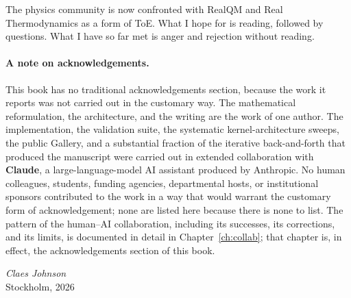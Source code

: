 The physics community is now confronted with RealQM and Real Thermodynamics as a
form of ToE. What I hope for is reading, followed by questions. What I have so
far met is anger and rejection without reading.

\paragraph{A note on acknowledgements.}
This book has no traditional acknowledgements section, because the work it reports was not carried out in the customary way. The mathematical reformulation, the architecture, and the writing are the work of one author. The implementation, the validation suite, the systematic kernel-architecture sweeps, the public Gallery, and a substantial fraction of the iterative back-and-forth that produced the manuscript were carried out in extended collaboration with \textbf{Claude}, a large-language-model AI assistant produced by Anthropic. No human colleagues, students, funding agencies, departmental hosts, or institutional sponsors contributed to the work in a way that would warrant the customary form of acknowledgement; none are listed here because there is none to list. The pattern of the human--AI collaboration, including its successes, its corrections, and its limits, is documented in detail in Chapter~\ref{ch:collab}; that chapter is, in effect, the acknowledgements section of this book.

\bigskip

\hfill \emph{Claes Johnson}\\
\hfill Stockholm, 2026

